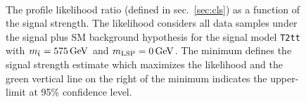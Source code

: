 \begin{figure}[t!]
  \begin{center}
     \\
    \caption{\label{fig:t2tt-int-575}The profile likelihood ratio 
      (defined in sec.~\ref{sec:cls}) as a function of the signal strength.
      The likelihood considers all data samples under the signal plus SM 
      background hypothesis for the signal model \texttt{T2tt} with 
      $m_{\tilde{\rm t}} = 575\,\text{Ge\hspace{-.08em}V}$ and $m_{\text{LSP}} = 0\,\text{Ge\hspace{-.08em}V}$.
      The minimum defines the signal strength estimate which maximizes the
      likelihood and the green vertical line on the right of the minimum 
      indicates the upper-limit at 95\% confidence level.}
  \end{center}
\end{figure}

